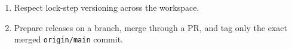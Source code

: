 \begin{enumerate}
  \begin{itemize}
  \tightlist
  \item
    version bump: \texttt{n\allowbreak{}p\allowbreak{}m\allowbreak{} \allowbreak{}r\allowbreak{}u\allowbreak{}n\allowbreak{} \allowbreak{}v\allowbreak{}e\allowbreak{}r\allowbreak{}s\allowbreak{}i\allowbreak{}o\allowbreak{}n\allowbreak{} \allowbreak{}X\allowbreak{}.\allowbreak{}Y\allowbreak{}.\allowbreak{}Z}
  \item
    metadata check: \texttt{n\allowbreak{}p\allowbreak{}m\allowbreak{} \allowbreak{}r\allowbreak{}u\allowbreak{}n\allowbreak{} \allowbreak{}r\allowbreak{}e\allowbreak{}l\allowbreak{}e\allowbreak{}a\allowbreak{}s\allowbreak{}e\allowbreak{}:\allowbreak{}p\allowbreak{}r\allowbreak{}e\allowbreak{}f\allowbreak{}l\allowbreak{}i\allowbreak{}g\allowbreak{}h\allowbreak{}t}
  \item
    local gauntlet: \texttt{n\allowbreak{}p\allowbreak{}m\allowbreak{} \allowbreak{}r\allowbreak{}u\allowbreak{}n\allowbreak{} \allowbreak{}r\allowbreak{}e\allowbreak{}l\allowbreak{}e\allowbreak{}a\allowbreak{}s\allowbreak{}e\allowbreak{}:\allowbreak{}r\allowbreak{}e\allowbreak{}a\allowbreak{}d\allowbreak{}i\allowbreak{}n\allowbreak{}e\allowbreak{}s\allowbreak{}s}
  \item
    CI dry-run: \texttt{.\allowbreak{}g\allowbreak{}i\allowbreak{}t\allowbreak{}h\allowbreak{}u\allowbreak{}b\allowbreak{}/\allowbreak{}w\allowbreak{}o\allowbreak{}r\allowbreak{}k\allowbreak{}f\allowbreak{}l\allowbreak{}o\allowbreak{}w\allowbreak{}s\allowbreak{}/\allowbreak{}r\allowbreak{}e\allowbreak{}l\allowbreak{}e\allowbreak{}a\allowbreak{}s\allowbreak{}e\allowbreak{}-\allowbreak{}d\allowbreak{}r\allowbreak{}y\allowbreak{}-\allowbreak{}r\allowbreak{}u\allowbreak{}n\allowbreak{}.\allowbreak{}y\allowbreak{}m\allowbreak{}l}
  \item
    tag publish: \texttt{.\allowbreak{}g\allowbreak{}i\allowbreak{}t\allowbreak{}h\allowbreak{}u\allowbreak{}b\allowbreak{}/\allowbreak{}w\allowbreak{}o\allowbreak{}r\allowbreak{}k\allowbreak{}f\allowbreak{}l\allowbreak{}o\allowbreak{}w\allowbreak{}s\allowbreak{}/\allowbreak{}p\allowbreak{}u\allowbreak{}b\allowbreak{}l\allowbreak{}i\allowbreak{}s\allowbreak{}h\allowbreak{}.\allowbreak{}y\allowbreak{}m\allowbreak{}l}
  \end{itemize}
\item
  Respect lock-step versioning across the workspace.
\item
  Prepare releases on a branch, merge through a PR, and tag only the exact merged \texttt{o\allowbreak{}r\allowbreak{}i\allowbreak{}g\allowbreak{}i\allowbreak{}n\allowbreak{}/\allowbreak{}m\allowbreak{}a\allowbreak{}i\allowbreak{}n} commit.
\end{enumerate}

